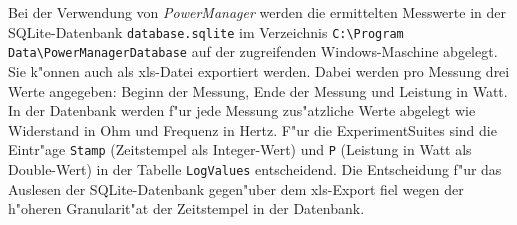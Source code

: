 Bei der Verwendung von \textit{PowerManager} werden die ermittelten Messwerte in der SQLite-Datenbank \texttt{database.sqlite} im Verzeichnis \texttt{C:\textbackslash Program Data\textbackslash PowerManagerDatabase} auf der zugreifenden Windows-Maschine abgelegt. Sie k"onnen auch als xls-Datei exportiert werden. Dabei werden pro Messung drei Werte angegeben: Beginn der Messung, Ende der Messung und Leistung in Watt. In der Datenbank werden f"ur jede Messung zus"atzliche Werte abgelegt wie Widerstand in Ohm und Frequenz in Hertz. F"ur die ExperimentSuites sind die Eintr"age \texttt{Stamp} (Zeitstempel als Integer-Wert) und \texttt{P} (Leistung in Watt als Double-Wert) in der Tabelle \texttt{LogValues} entscheidend. Die Entscheidung f"ur das Auslesen der SQLite-Datenbank gegen"uber dem xls-Export fiel wegen der h"oheren Granularit"at der Zeitstempel in der Datenbank. 


